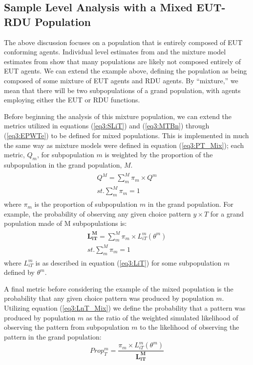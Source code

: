 \documentclass[../main.tex]{subfiles}
\begin{document}
\singlespacing
\subsection{Sample Level Analysis with a Mixed EUT-RDU Population}
\doublespacing

The above discussion focuses on a population that is entirely composed of EUT conforming agents.
Individual level estimates from \textcite{Hey1994} and the mixture model estimates from \textcite{Harrison2009} show that many populations are likely not composed entirely of EUT agents.
We can extend the example above, defining the population as being composed of some mixture of EUT agents and RDU agents.
By \enquote{mixture,} we mean that there will be two subpopulations of a grand population, with agents employing either the EUT or RDU functions.

Before beginning the analysis of this mixture population, we can extend the metrics utilized in equations (\ref{eq3:SLiT}) and (\ref{eq3:MTBn}) through (\ref{eq3:EPWTe}) to be defined for mixed populations.
This is implemented in much the same way as mixture models were defined in equation (\ref{eq3:PT_Mix}); each metric, $Q_m$, for subpopulation $m$ is weighted by the proportion of the subpopulation in the grand population, $M$.
\begin{align}
	\label{eq3:Metric_Mix}
	\begin{split}
		\bm{\mathit{Q^M}} = \sum_m^M \pi_m \times Q^m \\
		\mathit{st.} \sum_m^M \pi_m = 1
	\end{split}
\end{align}
\noindent where $\pi_m$ is the proportion of subpopulation $m$ in the grand population.
For example, the probability of observing any given choice pattern $y \times T$ for a grand population made of M subpopulations is:
\begin{align}
	\label{eq3:LnT_Mix}
	\begin{split}
		\bm{L_{iT}^M} = \sum_m^M \pi_m \times L_{iT}^m(\theta^m) \\
		\mathit{st.} \sum_m^M \pi_m = 1
	\end{split}
\end{align}
\noindent where $L_{iT}^m$ is as described in equation (\ref{eq3:LiT}) for some subpopulation $m$ defined by $\theta^m$.

A final metric before considering the example of the mixed population is the probability that any given choice pattern was produced by population $m$.
Utilizing equation (\ref{eq3:LnT_Mix}) we define the probability that a pattern was produced by population $m$ as the ratio of the weighted simulated likelihood of observing the pattern from subpopulation $m$ to the likelihood of observing the pattern in the grand population:
\begin{equation}
	\label{eq3:Propm}
	\mathit{Prop^m_{T}} = \frac{\pi_m \times L_{iT}^m(\theta^m) }{\bm{L_{iT}^M}}
\end{equation}
\end{document}
